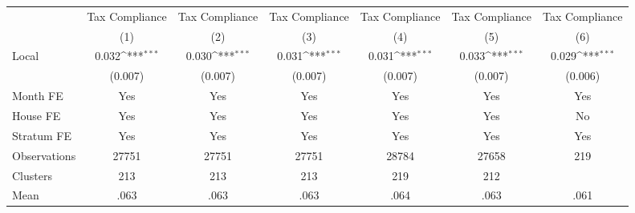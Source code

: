 {
\def\sym#1{\ifmmode^{#1}\else\(^{#1}\)\fi}
\begin{tabular}{l*{6}{c}}
\hline\hline
                &\multicolumn{1}{c}{Tax Compliance}&\multicolumn{1}{c}{Tax Compliance}&\multicolumn{1}{c}{Tax Compliance}&\multicolumn{1}{c}{Tax Compliance}&\multicolumn{1}{c}{Tax Compliance}&\multicolumn{1}{c}{Tax Compliance}\\
                &\multicolumn{1}{c}{(1)}         &\multicolumn{1}{c}{(2)}         &\multicolumn{1}{c}{(3)}         &\multicolumn{1}{c}{(4)}         &\multicolumn{1}{c}{(5)}         &\multicolumn{1}{c}{(6)}         \\
\hline
Local           &    0.032\sym{***}&    0.030\sym{***}&    0.031\sym{***}&    0.031\sym{***}&    0.033\sym{***}&    0.029\sym{***}\\
                &  (0.007)         &  (0.007)         &  (0.007)         &  (0.007)         &  (0.007)         &  (0.006)         \\
Month FE        &      Yes         &      Yes         &      Yes         &      Yes         &      Yes         &      Yes         \\
House FE        &      Yes         &      Yes         &      Yes         &      Yes         &      Yes         &       No         \\
Stratum FE      &      Yes         &      Yes         &      Yes         &      Yes         &      Yes         &      Yes         \\
\hline
Observations    &    27751         &    27751         &    27751         &    28784         &    27658         &      219         \\
Clusters        &      213         &      213         &      213         &      219         &      212         &                  \\
Mean            &     .063         &     .063         &     .063         &     .064         &     .063         &     .061         \\
\hline\hline
\end{tabular}
}

